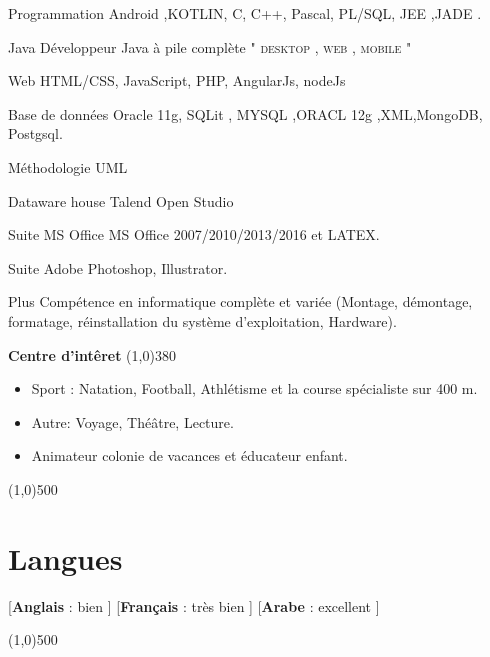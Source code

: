 \documentclass{scrartcl}
\begin{document}
\begin{cv}{}
\begin{cvlist}{ }
	\item[{\color{blue}Programmation}] Android ,KOTLIN, C, C++, Pascal, PL/SQL, JEE ,JADE  .
	\item[{\color{blue}Java}] Développeur Java à pile complète " \textsc{desktop , web , mobile} "  
	\item[{\color{blue}Web}] HTML/CSS, JavaScript,   PHP,  AngularJs, nodeJs 
	\item[{\color{blue}Base de données}] Oracle 11g, SQLit , MYSQL ,ORACL 12g ,XML,MongoDB, Postgsql.
	\item[{\color{blue}Méthodologie}] UML
	\item[{\color{blue}Dataware house}]   Talend Open Studio
	\item[{\color{blue}Suite MS Office}] MS Office 2007/2010/2013/2016 et  LATEX.
	\item[{\color{blue}Suite Adobe}] Photoshop, Illustrator.
	 \item[{\color{blue}Plus}] 	Compétence en informatique complète et variée (Montage, démontage, formatage, réinstallation du système d’exploitation, Hardware).
 	\end{cvlist} 	                                                                                                              
  \textbf{{\Large{\color{blue}Cen}tre d’intêret }}\line(1,0){380}                    

\begin{itemize}
 \item  Sport : Natation, Football, Athlétisme et la course spécialiste  sur 400 m.
 \item Autre: Voyage, Théâtre, Lecture.
 \item Animateur colonie de vacances et éducateur enfant.
 
\end{itemize}
 


\line(1,0){500} \section *{{\color{blue}Langues}} 

[\textbf{Anglais} :   {\color{blue}bien} ]
[\textbf{Français} :{\color{blue} très bien} ] 
[\textbf{Arabe} : {\color{blue}excellent} ]

\line(1,0){500} 
\date{\today{}}
\end{cv}
\end{document}
